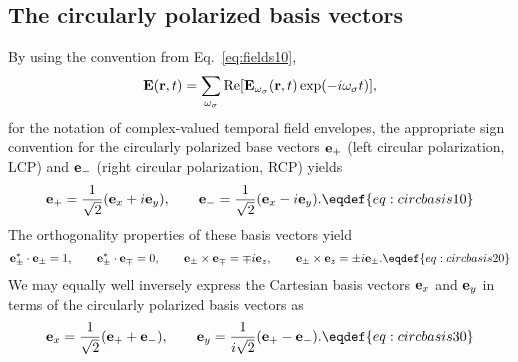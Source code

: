 \subsection{The circularly polarized basis vectors}
By using the convention from Eq.~\eqref{eq:fields10},
$$
  {\bf E}({\bf r},t)=\sum_{\omega_{\sigma}}{\rm Re}[
           {\bf E}_{\omega_{\sigma}}({\bf r},t)\exp(-i\omega_{\sigma}t)],
$$
for the notation of complex-valued temporal field envelopes, the appropriate
sign convention for the circularly polarized base vectors ${\bf e}_+$ (left
circular polarization, LCP) and ${\bf e}_-$ (right circular polarization, RCP)
yields
$$
  {\bf e}_+={{1}\over{\sqrt{2}}}({\bf e}_x+i{\bf e}_y),\qquad
  {\bf e}_-={{1}\over{\sqrt{2}}}({\bf e}_x-i{\bf e}_y).
  \eqdef{eq:circbasis10}
$$
The orthogonality properties of these basis vectors yield
$$
  {\bf e}^*_{\pm}\cdot{\bf e}_{\pm}=1,\qquad
  {\bf e}^*_{\pm}\cdot{\bf e}_{\mp}=0,\qquad
  {\bf e}_{\pm}\times{\bf e}_{\mp}=\mp i{\bf e}_z,\qquad
  {\bf e}_{\pm}\times{\bf e}_z = \pm i{\bf e}_{\pm}.
  \eqdef{eq:circbasis20}
$$
We may equally well inversely express the Cartesian basis vectors ${\bf e}_x$
and ${\bf e}_y$ in terms of the circularly polarized basis vectors as
$$
  {\bf e}_x={{1}\over{\sqrt{2}}}({\bf e}_++{\bf e}_-),\qquad
  {\bf e}_y={{1}\over{i\sqrt{2}}}({\bf e}_+-{\bf e}_-).
  \eqdef{eq:circbasis30}
$$

